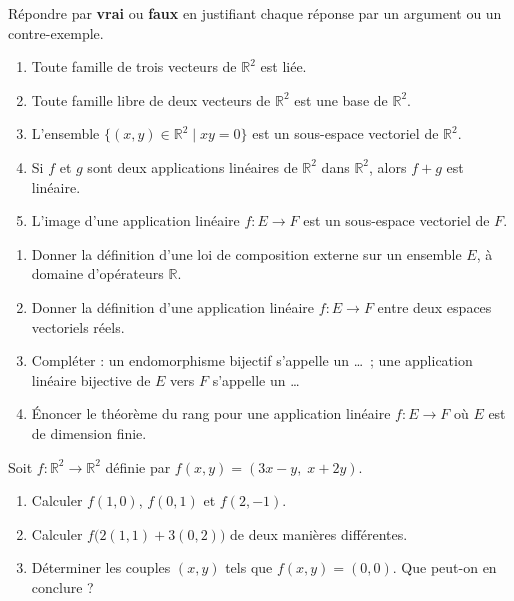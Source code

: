 \documentclass[11pt]{article}
\begin{document}
\begin{exercice}
Répondre par \textbf{vrai} ou \textbf{faux} en justifiant chaque réponse par un argument ou un contre-exemple.
\begin{enumerate}
\item Toute famille de trois vecteurs de $\mathbb{R}^2$ est liée.
\item Toute famille libre de deux vecteurs de $\mathbb{R}^2$ est une base de $\mathbb{R}^2$.
\item L'ensemble $\{(x,y)\in\mathbb{R}^2 \mid xy=0\}$ est un sous-espace vectoriel de $\mathbb{R}^2$.
\item Si $f$ et $g$ sont deux applications linéaires de $\mathbb{R}^2$ dans $\mathbb{R}^2$, alors $f+g$ est linéaire.
\item L'image d'une application linéaire $f:E\to F$ est un sous-espace vectoriel de $F$.
\end{enumerate}
\end{exercice}

\begin{exercice}
\begin{enumerate}
\item Donner la définition d'une loi de composition externe sur un ensemble $E$, à domaine d'opérateurs $\mathbb{R}$.
\item Donner la définition d'une application linéaire $f:E\to F$ entre deux espaces vectoriels réels.
\item Compléter : un endomorphisme bijectif s'appelle un \ldots\ ; une application linéaire bijective de $E$ vers $F$ s'appelle un \ldots
\item Énoncer le théorème du rang pour une application linéaire $f:E\to F$ où $E$ est de dimension finie.
\end{enumerate}
\end{exercice}

\begin{exercice}
Soit $f:\mathbb{R}^2\to\mathbb{R}^2$ définie par $f(x,y)=(3x-y,\;x+2y)$.
\begin{enumerate}
\item Calculer $f(1,0)$, $f(0,1)$ et $f(2,-1)$.
\item Calculer $f\big(2(1,1)+3(0,2)\big)$ de deux manières différentes.
\item Déterminer les couples $(x,y)$ tels que $f(x,y)=(0,0)$. Que peut-on en conclure ?
\end{enumerate}
\end{exercice}
\end{document}
